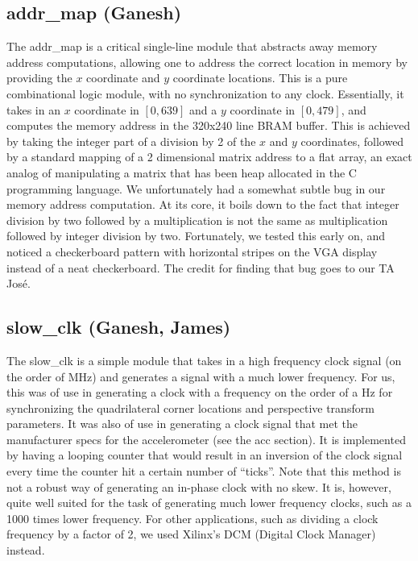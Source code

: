 \documentclass{article}
\begin{document}
\subsection{addr\_map (Ganesh)}
The addr\_map is a critical single-line module that abstracts away memory address computations,
allowing one to address the correct location in memory by providing the $x$ coordinate and $y$ coordinate locations.
This is a pure combinational logic module, with no synchronization to any clock.
Essentially, it takes in an $x$ coordinate in $[0, 639]$ and a $y$ coordinate in $[0, 479]$,
and computes the memory address in the 320x240 line BRAM buffer.
This is achieved by taking the integer part of a division by 2 of the $x$ and $y$ coordinates,
followed by a standard mapping of a 2 dimensional matrix address to a flat array,
an exact analog of manipulating a matrix that has been heap allocated in the C programming language.
We unfortunately had a somewhat subtle bug in our memory address computation.
At its core, it boils down to the fact that integer division by two followed by a multiplication is not the same as multiplication followed by integer division by two.
Fortunately, we tested this early on, and noticed a checkerboard pattern with horizontal stripes on the VGA display instead of a neat checkerboard.
The credit for finding that bug goes to our TA Jos\'{e}.

\subsection{slow\_clk (Ganesh, James)}
The slow\_clk is a simple module that takes in a high frequency clock signal (on the order of MHz)
and generates a signal with a much lower frequency.
For us,
this was of use in generating a clock with a frequency on the order of a Hz for synchronizing the quadrilateral corner locations and perspective transform parameters.
It was also of use in generating a clock signal that met the manufacturer specs for the accelerometer (see the acc section).
It is implemented by having a looping counter that would result in an inversion of the clock signal every time the counter hit a certain number of ``ticks''.
Note that this method is not a robust way of generating an in-phase clock with no skew.
It is, however, quite well suited for the task of generating much lower frequency clocks, such as a 1000 times lower frequency.
For other applications, such as dividing a clock frequency by a factor of 2, we used Xilinx's DCM (Digital Clock Manager) instead.
\end{document}

